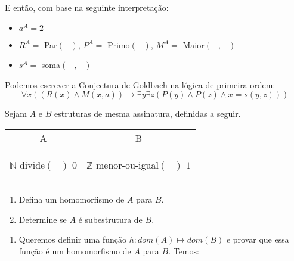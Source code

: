 \begin{rexercises}
\begin{question}
\begin{resolution}
            E então, com base na seguinte interpretação:
            \begin{itemize}
                \item $a^A = 2$
                \item $R^A =$ Par$(-)$, $P^A =$ Primo$(-)$, $M^A =$ Maior$(-,-)$
                \item $s^A =$ soma$(-,-)$
            \end{itemize}
            Podemos escrever a Conjectura de Goldbach na lógica de primeira ordem:
            \[\forall x( (R(x) \land M(x, a)) \rightarrow \exists y \exists z(P(y) \land P(z) \land x = s(y, z)))\]
        \end{resolution}
    \end{question}

    \begin{question}
        Sejam $A$ e $B$ estruturas de mesma assinatura, definidas a seguir.
        \begin{table}[h]
            \centering
            \begin{tabular}{c c}
                A & B \\
                \begin{structure}
                    {$\mathbb{N}$}
                    {}
                    {divide$(-)$}
                    {$0$}
                    {}
                \end{structure}
                &
                \begin{structure}
                    {$\mathbb{Z}$}
                    {}
                    {menor-ou-igual$(-)$}
                    {$1$}
                    {}
                \end{structure}
            \end{tabular}
        \end{table}
        \begin{enumerate}
            \item Defina um homomorfismo de $A$ para $B$.
            \item Determine se $A$ é subestrutura de $B$.
        \end{enumerate}
        \begin{resolution}
            \begin{enumerate}[leftmargin=*]
                \item Queremos definir uma função $h: dom(A) \mapsto dom(B)$ e provar que essa função é um homomorfismo de $A$ para $B$. Temos:
                

\end{enumerate}
\end{resolution}
\end{question}
\end{rexercises}
